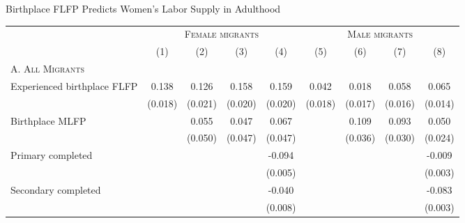 \begin{center}
\begin{adjustbox}{max width=1\textwidth}
\begin{threeparttable}[!h]
\caption{Birthplace FLFP Predicts Women's Labor Supply in Adulthood}
\label{tab:tab:baseline_bp_exp}
\begin{tabular}{lcccccccc}
\toprule
& \multicolumn{4}{c}{{\scshape Female migrants}} & \multicolumn{4}{c}{{\scshape Male migrants}} \\ \cmidrule(r){2-5} \cmidrule(l){6-9}
{ \scshape  }&\multicolumn{1}{c}{(1)}&\multicolumn{1}{c}{(2)}&\multicolumn{1}{c}{(3)}&\multicolumn{1}{c}{(4)}&\multicolumn{1}{c}{(5)}&\multicolumn{1}{c}{(6)}&\multicolumn{1}{c}{(7)}&\multicolumn{1}{c}{(8)} \\
\midrule
\scshape A. All Migrants\\
\midrule  Experienced birthplace FLFP&       0.138\sym{***}&       0.126\sym{***}&       0.158\sym{***}&       0.159\sym{***}&       0.042\sym{*}  &       0.018         &       0.058\sym{***}&       0.065\sym{***}\\
                    &     (0.018)         &     (0.021)         &     (0.020)         &     (0.020)         &     (0.018)         &     (0.017)         &     (0.016)         &     (0.014)         \\
 Birthplace MLFP    &                     &       0.055         &       0.047         &       0.067         &                     &       0.109\sym{**} &       0.093\sym{**} &       0.050\sym{*}  \\
                    &                     &     (0.050)         &     (0.047)         &     (0.047)         &                     &     (0.036)         &     (0.030)         &     (0.024)         \\
Primary completed   &                     &                     &                     &      -0.094\sym{***}&                     &                     &                     &      -0.009\sym{**} \\
                    &                     &                     &                     &     (0.005)         &                     &                     &                     &     (0.003)         \\
Secondary completed &                     &                     &                     &      -0.040\sym{***}&                     &                     &                     &      -0.083\sym{***}\\
                    &                     &                     &                     &     (0.008)         &                     &                     &                     &     (0.003)         \\

\end{tabular}
\end{threeparttable}
\end{adjustbox}
\end{center}
